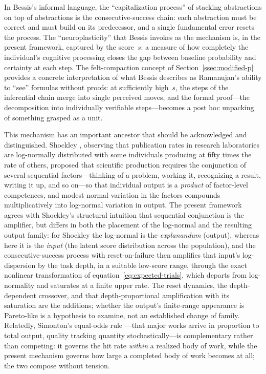 \documentclass{article}
\begin{document}
In Bessis's informal language, the ``capitalization process'' of stacking abstractions on top of abstractions is the consecutive-success chain: each abstraction must be correct and must build on its predecessor, and a single fundamental error resets the process. The ``neuroplasticity'' that Bessis invokes as the mechanism is, in the present framework, captured by the score~$s$: a measure of how completely the individual's cognitive processing closes the gap between baseline probability and certainty at each step. The felt-compaction concept of Section~\ref{ssec:modified-p} provides a concrete interpretation of what Bessis describes as Ramanujan's ability to ``see'' formulas without proofs: at sufficiently high~$s$, the steps of the inferential chain merge into single perceived moves, and the formal proof---the decomposition into individually verifiable steps---becomes a post hoc unpacking of something grasped as a unit.

This mechanism has an important ancestor that should be acknowledged and distinguished. Shockley \cite{shockley1957}, observing that publication rates in research laboratories are log-normally distributed with some individuals producing at fifty times the rate of others, proposed that scientific production requires the conjunction of several sequential factors---thinking of a problem, working it, recognizing a result, writing it up, and so on---so that individual output is a \emph{product} of factor-level competences, and modest normal variation in the factors compounds multiplicatively into log-normal variation in output. The present framework agrees with Shockley's structural intuition that sequential conjunction is the amplifier, but differs in both the placement of the log-normal and the resulting output family: for Shockley the log-normal is the \emph{explanandum} (output), whereas here it is the \emph{input} (the latent score distribution across the population), and the consecutive-success process with reset-on-failure then amplifies that input's log-dispersion by the task depth, in a suitable low-score range, through the exact nonlinear transformation of equation~\eqref{eq:expected-trials}, which departs from log-normality and saturates at a finite upper rate. The reset dynamics, the depth-dependent crossover, and that depth-proportional amplification with its saturation are the additions; whether the output's finite-range appearance is Pareto-like is a hypothesis to examine, not an established change of family. Relatedly, Simonton's equal-odds rule \cite{simonton1997}---that major works arrive in proportion to total output, quality tracking quantity stochastically---is complementary rather than competing: it governs the hit rate \emph{within} a realized body of work, while the present mechanism governs how large a completed body of work becomes at all; the two compose without tension.
\end{document}
